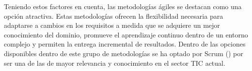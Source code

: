 

Teniendo estos factores en cuenta, las metodologías ágiles se destacan como una opción atractiva. Estas metodologías ofrecen la flexibilidad necesaria para adaptarse a cambios en los requisitos a medida que se adquiere un mejor conocimiento del dominio, promueve el aprendizaje continuo dentro de un entorno complejo y permiten la entrega incremental de resultados. Dentro de las opciones disponibles dentro de este grupo de metodologías se ha optado por Scrum (\cite{scrum}) por ser una de las de mayor relevancia y conocimiento en el sector TIC actual.\\

